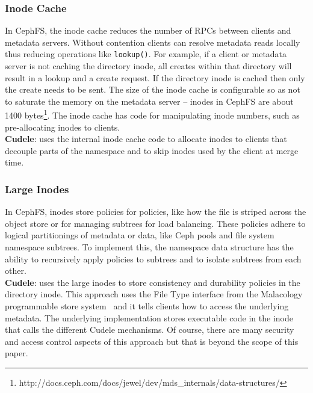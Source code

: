 \subsubsection{Inode Cache}
\label{sec:inode-cache}

In CephFS, the inode cache reduces the number of RPCs between clients and
metadata servers. Without contention clients can resolve metadata reads locally
thus reducing operations like \texttt{lookup()}.  For example, if a client or
metadata server is not caching the directory inode, all creates within that
directory will result in a lookup and a create request. If the directory inode
is cached then only the create needs to be sent.  The size of the inode cache
is configurable so as not to saturate the memory on the metadata server --
inodes in CephFS are about 1400
bytes\footnote{http://docs.ceph.com/docs/jewel/dev/mds\_internals/data-structures/}.
The inode cache has code for manipulating inode numbers, such as pre-allocating
inodes to clients.\\

\noindent\textbf{Cudele}: uses the internal inode cache code to allocate inodes
to clients that decouple parts of the namespace and to skip inodes used by the
client at merge time.

\subsubsection{Large Inodes}
\label{sec:large-inodes}

In CephFS, inodes store policies for policies, like how the file is striped
across the object store or for managing subtrees for load balancing. These
policies adhere to logical partitionings of metadata or data, like Ceph pools and file
system namespace subtrees. To implement this, the namespace data structure has
the ability to recursively apply policies to subtrees and to isolate subtrees
from each other.  \\

\noindent\textbf{Cudele}: uses the large inodes to store consistency and
durability policies in the directory inode. This approach uses the File Type
interface from the Malacology programmable store
system~\cite{sevilla:eurosys17} and it tells clients how to access the
underlying metadata. The underlying implementation stores executable code in
the inode that calls the different Cudele mechanisms. Of course, there are many
security and access control aspects of this approach but that is beyond the
scope of this paper.



%


